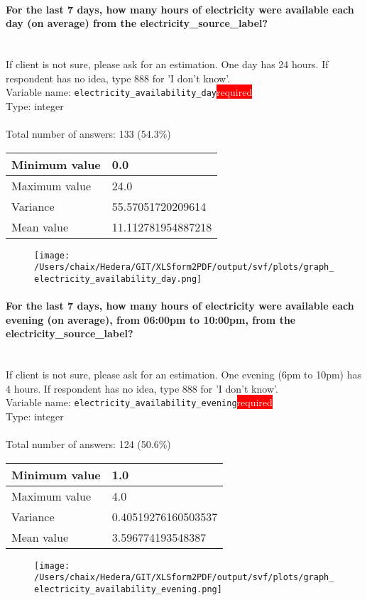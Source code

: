 \documentclass[11.5pt, a4paper]{scrartcl}
\begin{document}
\paragraph{For the last 7 days, how many hours of electricity were available each day (on average) from the electricity\_source\_label?}
\ \\ {\small If client is not sure, please ask for an estimation. One day has 24 hours. If respondent has no idea, type 888 for 'I don't know'.}
\  \\Variable name: \texttt{electricity\_availability\_day}\hfill\colorbox{red}{\small{\textcolor{white}{required}}}\\
 Type: integer\\
\\Total number of answers: 133 (54.3\%)
\\[0.2em] \begin{tabular}{p{4cm}|p{8cm}}
Minimum value &0.0 \\
\hline
\cellcolor{mygray} Maximum value & \cellcolor{mygray}24.0 \\
\hline
Variance &55.57051720209614 \\
\hline
\cellcolor{mygray} Mean value & \cellcolor{mygray}11.112781954887218 \\
\hline
\end{tabular}
\begin{figure}[H]
\centering
\texttt{[image: /Users/chaix/Hedera/GIT/XLSform2PDF/output/svf/plots/graph\_electricity\_availability\_day.png]}
\end{figure}
\paragraph{For the last 7 days, how many hours of electricity were available each evening (on average), from 06:00pm to 10:00pm, from the electricity\_source\_label?}
\ \\ {\small If client is not sure, please ask for an estimation. One evening (6pm to 10pm) has 4 hours. If respondent has no idea, type 888 for 'I don't know'.}
\  \\Variable name: \texttt{electricity\_availability\_evening}\hfill\colorbox{red}{\small{\textcolor{white}{required}}}\\
 Type: integer\\
\\Total number of answers: 124 (50.6\%)
\\[0.2em] \begin{tabular}{p{4cm}|p{8cm}}
Minimum value &1.0 \\
\hline
\cellcolor{mygray} Maximum value & \cellcolor{mygray}4.0 \\
\hline
Variance &0.40519276160503537 \\
\hline
\cellcolor{mygray} Mean value & \cellcolor{mygray}3.596774193548387 \\
\hline
\end{tabular}
\begin{figure}[H]
\centering
\texttt{[image: /Users/chaix/Hedera/GIT/XLSform2PDF/output/svf/plots/graph\_electricity\_availability\_evening.png]}
\end{figure}
\end{document}
